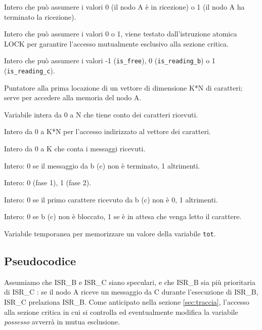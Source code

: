\documentclass{article}
\begin{document}
\begin{description}[style=nextline,leftmargin=3.45cm,labelwidth=2.8cm,labelsep=0.6cm,font=\ttfamily\bfseries]
  \item[fine] Intero che può assumere i valori 0 (il nodo A è in ricezione) o 1 (il nodo A ha terminato la ricezione).
  \item[lock] Intero che può assumere i valori 0 o 1, viene testato dall'istruzione atomica LOCK per garantire l'accesso mutualmente esclusivo alla sezione critica.
  \item[possesso] Intero che può assumere i valori -1 (\texttt{is\_free}), 0 (\texttt{is\_reading\_b}) o 1 (\texttt{is\_reading\_c}).
  \item[buff] Puntatore alla prima locazione di un vettore di dimensione K*N di caratteri; serve per accedere alla memoria del nodo A.
  \item[curr] Variabile intera da 0 a N che tiene conto dei caratteri ricevuti.
  \item[tot] Intero da 0 a K*N per l’accesso indirizzato al vettore dei caratteri.
  \item[msg] Intero da 0 a K che conta i messaggi ricevuti.
  \item[end\_b,(end\_c)] Intero: 0 se il messaggio da b (c) non è terminato, 1 altrimenti.
  \item[fase2] Intero: 0 (fase 1), 1 (fase 2).
  \item[cond\_b,(cond\_c)] Intero: 0 se il primo carattere ricevuto da b (c) non è 0, 1 altrimenti.
  \item[b\_sus,(c\_sus)] Intero: 0 se b (c) non è bloccato, 1 se è in attesa che venga letto il carattere.
  \item[idx] Variabile temporanea per memorizzare un valore della variabile \texttt{tot}.
\end{description}

\subsection{Pseudocodice}
Assumiamo che ISR\_B e ISR\_C siano speculari, e che ISR\_B sia più prioritaria di ISR\_C : se il nodo A riceve un messaggio da C durante l'esecuzione di ISR\_B, ISR\_C prelaziona ISR\_B. Come anticipato nella sezione \ref{sec:traccia}, l'accesso alla sezione critica in cui si controlla ed eventualmente modifica la variabile \textit{possesso} avverrà in mutua esclusione.
\end{document}
